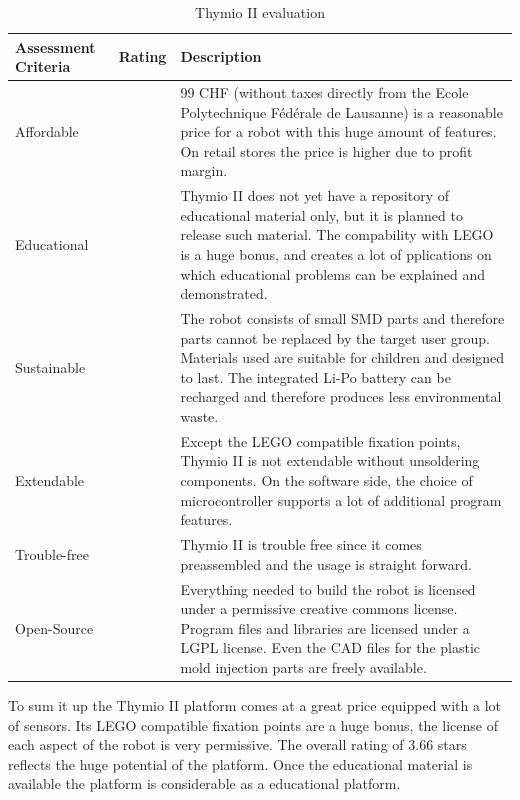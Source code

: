 \documentclass[11pt,a4paper]{article}
\newcounter{starnumber}
\newcommand{\stars}[1]{
  \forloop{starnumber}{1}{\value{starnumber} < 6}{
    \ifthenelse{#1 < \value{starnumber}}{\ding{73}}{\ding{72}}%
  }
}
\begin{document}
\begin{table}[h!]
\centering
\begin{tabular}{p{}p{}p{}}
\toprule
Assessment Criteria    & Rating & Description \\
\midrule
Affordable  & \stars{4}    & 99 CHF (without taxes directly from the Ecole Polytechnique Fédérale de Lausanne) is a reasonable price for a robot with this huge amount of features. On retail stores the price is higher due to profit margin.\\
Educational & \stars{3}     & Thymio II does not yet have a repository of educational material only, but it is planned to release such material. The compability with LEGO is a huge bonus, and creates a lot of pplications on which educational problems can be explained and demonstrated.\\
Sustainable  & \stars{3}     & The robot consists of small SMD parts and therefore parts cannot be replaced by the target user group. Materials used are suitable for children and designed to last. The integrated Li-Po battery can be recharged and therefore produces less environmental waste.\\
Extendable & \stars{3} & Except the LEGO compatible fixation points, Thymio II is not extendable without unsoldering components. On the software side, the choice of microcontroller supports a lot of additional program features.\\
Trouble-free & \stars{4} & Thymio II is trouble free since it comes preassembled and the usage is straight forward.\\
Open-Source & \stars{5} & Everything needed to build the robot is licensed under a permissive creative commons license. Program files and libraries are licensed under a LGPL license. Even the CAD files for the plastic mold injection parts are freely available.\\
\bottomrule
\end{tabular}
\caption{Thymio II evaluation}
\label{tbl:thymio_eval}
\end{table}

To sum it up the Thymio II platform comes at a great price equipped with a lot of sensors. Its LEGO compatible fixation points are a huge bonus, the license of each aspect of the robot is very permissive. The overall rating of 3.66 stars reflects the huge potential of the platform. Once the educational material is available the platform is considerable as a educational platform.
\end{document}
